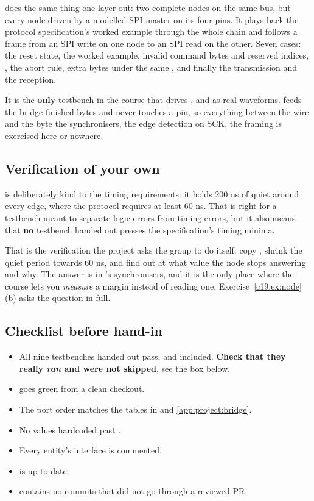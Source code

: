  does the same thing one layer out: two complete nodes on the same bus, but
every node driven by a modelled SPI master on its four pins. It plays back the protocol
specification's worked example through the whole chain and follows a frame from an SPI write on one
node to an SPI read on the other. Seven cases: the reset state, the worked example, invalid command
bytes and reserved indices, , the abort rule, extra bytes under the same ,
and finally the transmission and the reception.

It is the \textbf{only} testbench in the course that drives ,  and  as
real waveforms.  feeds the bridge finished bytes and never touches a pin, so
everything between the wire and the byte \textemdash{} the synchronisers, the edge detection on SCK,
the  framing \textemdash{} is exercised here or nowhere.

\subsection{Verification of your own}
\label{app:project:ownverify}

 is deliberately kind to the timing requirements: it holds 200 ns of quiet
around every  edge, where the protocol requires at least 60 ns. That is right for a testbench
meant to separate logic errors from timing errors, but it also means that \textbf{no} testbench handed
out presses the specification's timing minima.

That is the verification the project asks the group to do itself: copy , shrink
the quiet period towards 60 ns, and find out at what value the node stops answering and why. The
answer is in 's synchronisers, and it is the only place where the course lets you
\emph{measure} a margin instead of reading one. Exercise~\ref{c19:ex:node}(b) asks the question in
full.

\subsection{Checklist before hand-in}
\label{app:project:checklist}

\begin{itemize}
  \item All nine testbenches handed out pass,  and 
    included. \textbf{Check that they really \emph{ran} and were not skipped}, see the box below.
  \item {} goes green from a clean checkout.
  \item The port order matches the tables in  and
    \ref{app:project:bridge}.
  \item No values hardcoded past .
  \item Every entity's interface is commented.
  \item {} is up to date.
  \item {} contains no commits that did not go through a reviewed PR.
\end{itemize}

